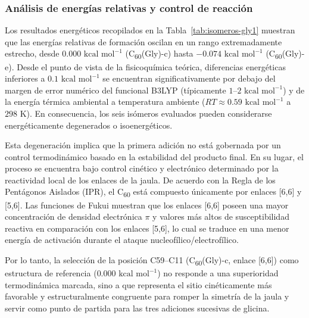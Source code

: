 \subsubsection{Análisis de energías relativas y control de reacción}

Los resultados energéticos recopilados en la Tabla~\ref{tab:isomeros-gly1} muestran que las energías relativas de formación oscilan en un rango extremadamente estrecho, desde $0.000\text{ kcal mol}^{-1}$ (C\textsubscript{60}(Gly)-c) hasta $-0.074\text{ kcal mol}^{-1}$ (C\textsubscript{60}(Gly)-e). Desde el punto de vista de la fisicoquímica teórica, diferencias energéticas inferiores a $0.1\text{ kcal mol}^{-1}$ se encuentran significativamente por debajo del margen de error numérico del funcional B3LYP (típicamente $1\text{--}2\text{ kcal mol}^{-1}$) y de la energía térmica ambiental a temperatura ambiente ($RT \approx 0.59\text{ kcal mol}^{-1}$ a $298\text{ K}$). En consecuencia, los seis isómeros evaluados pueden considerarse energéticamente degenerados o isoenergéticos.

Esta degeneración implica que la primera adición no está gobernada por un control termodinámico basado en la estabilidad del producto final. En su lugar, el proceso se encuentra bajo control cinético y electrónico determinado por la reactividad local de los enlaces de la jaula. De acuerdo con la Regla de los Pentágonos Aislados (IPR), el C\textsubscript{60} está compuesto únicamente por enlaces [6,6] y [5,6]. Las funciones de Fukui muestran que los enlaces [6,6] poseen una mayor concentración de densidad electrónica $\pi$ y valores más altos de susceptibilidad reactiva en comparación con los enlaces [5,6], lo cual se traduce en una menor energía de activación durante el ataque nucleofílico/electrofílico.

Por lo tanto, la selección de la posición C59--C11 (C\textsubscript{60}(Gly)-c, enlace [6,6]) como estructura de referencia ($0.000\text{ kcal mol}^{-1}$) no responde a una superioridad termodinámica marcada, sino a que representa el sitio cinéticamente más favorable y estructuralmente congruente para romper la simetría de la jaula y servir como punto de partida para las tres adiciones sucesivas de glicina.

